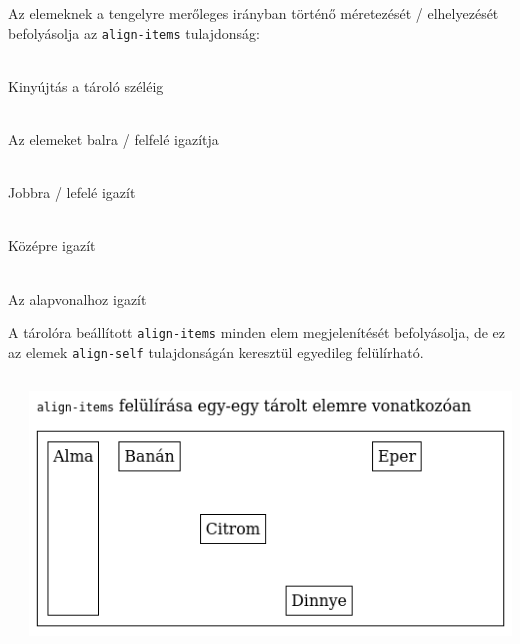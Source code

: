 %
\begin{frame}
  Az elemeknek a tengelyre merőleges irányban történő méretezését / elhelyezését befolyásolja az \texttt{align-items} tulajdonság:
  \begin{description}[m]
    \item[\texttt{stretch}] \hfill \\ Kinyújtás a tároló széléig
    \item[\texttt{flex-start}] \hfill \\ Az elemeket balra / felfelé igazítja
    \item[\texttt{flex-end}] \hfill \\ Jobbra / lefelé igazít
    \item[\texttt{center}] \hfill \\ Középre igazít
    \item[\texttt{baseline}] \hfill \\ Az alapvonalhoz igazít
  \end{description}
\end{frame}

%
\begin{frame}
  A tárolóra beállított \texttt{align-items} minden elem megjelenítését befolyásolja, de ez az elemek \texttt{align-self} tulajdonságán keresztül egyedileg felülírható.
  \vfill
  \begin{columns}
      \begin{exampleblock}{}
        \scriptsize
        
      \end{exampleblock}
      \includegraphics[width=\textwidth]{align-self.png}
  \end{columns}
\end{frame}

